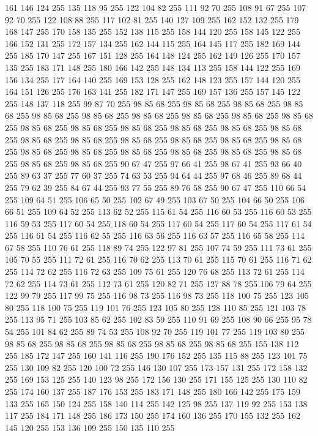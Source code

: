 161 146 124 255 135 118 95 255 122 104 82 255 111 92 70 255 108 91 67 255 107 92 70 255 122 108 88 255 117 102 81 255 140 127 109 255 162 152 132 255 179 168 147 255 170 158 135 255 152 138 115 255 158 144 120 255 158 145 122 255 166 152 131 255 172 157 134 255 162 144 115 255 164 145 117 255 182 169 144 255 185 170 147 255 167 151 128 255 164 148 124 255 162 149 126 255 170 157 135 255 183 171 148 255 180 166 142 255 148 134 113 255 158 144 122 255 169 156 134 255 177 164 140 255 169 153 128 255 162 148 123 255 157 144 120 255 164 151 126 255 176 163 141 255 182 171 147 255 169 157 136 255 157 145 122 255 148 137 118 255 99 87 70 255 98 85 68 255 98 85 68 255 98 85 68 255 98 85 68 255 98 85 68 255 98 85 68 255 98 85 68 255 98 85 68 255 98 85 68 255 98 85 68 255 98 85 68 255 98 85 68 255 98 85 68 255 98 85 68 255 98 85 68 255 98 85 68 255 98 85 68 255 98 85 68 255 98 85 68 255 98 85 68 255 98 85 68 255 98 85 68 255 98 85 68 255
98 85 68 255 98 85 68 255 98 85 68 255 98 85 68 255 98 85 68 255 98 85 68 255 98 85 68 255 90 67 47 255 97 66 41 255 98 67 41 255 93 66 40 255 89 63 37 255 77 60 37 255 74 63 53 255 94 64 44 255 97 68 46 255 89 68 44 255 79 62 39 255 84 67 44 255 93 77 55 255 89 76 58 255 90 67 47 255 110 66 54 255 109 64 51 255 106 65 50 255 102 67 49 255 103 67 50 255 104 66 50 255 106 66 51 255 109 64 52 255 113 62 52 255 115 61 54 255 116 60 53 255 116 60 53 255 116 59 53 255 117 60 54 255 118 60 54 255 117 60 54 255 117 60 54 255 117 61 54 255 116 61 54 255 116 62 55 255 116 63 56 255 116 63 57 255 116 65 58 255 114 67 58 255 110 76 61 255 118 89 74 255 122 97 81 255 107 74 59 255 111 73 61 255 105 70 55 255 111 72 61 255 116 70 62 255 113 70 61 255 115 70 61 255 116 71 62 255 114 72 62 255 116 72 63 255 109 75 61 255 120 76 68 255 113 72 61 255 114 72 62 255 114 73 61 255
112 73 61 255 120 82 71 255 127 88 78 255 106 79 64 255 122 99 79 255 117 99 75 255 116 98 73 255 116 98 73 255 118 100 75 255 123 105 80 255 118 100 75 255 119 101 76 255 123 105 80 255 128 110 85 255 121 103 78 255 113 95 71 255 103 85 62 255 102 83 59 255 110 91 69 255 108 90 66 255 95 78 54 255 101 84 62 255 89 74 53 255 108 92 70 255 119 101 77 255 119 103 80 255 98 85 68 255 98 85 68 255 98 85 68 255 98 85 68 255 98 85 68 255 155 138 112 255 185 172 147 255 160 141 116 255 190 176 152 255 135 115 88 255 123 101 75 255 130 109 82 255 120 100 72 255 146 130 107 255 173 157 131 255 172 158 132 255 169 153 125 255 140 123 98 255 172 156 130 255 171 155 125 255 130 110 82 255 174 160 137 255 187 176 153 255 183 171 148 255 180 166 142 255 175 159 133 255 165 150 124 255 158 140 114 255 142 125 98 255 137 119 92 255 153 138 117 255 184 171 148 255 186 173 150 255 174 160 136 255 170 155 132 255 162 145 120 255 153 136 109 255 150 135 110 255
